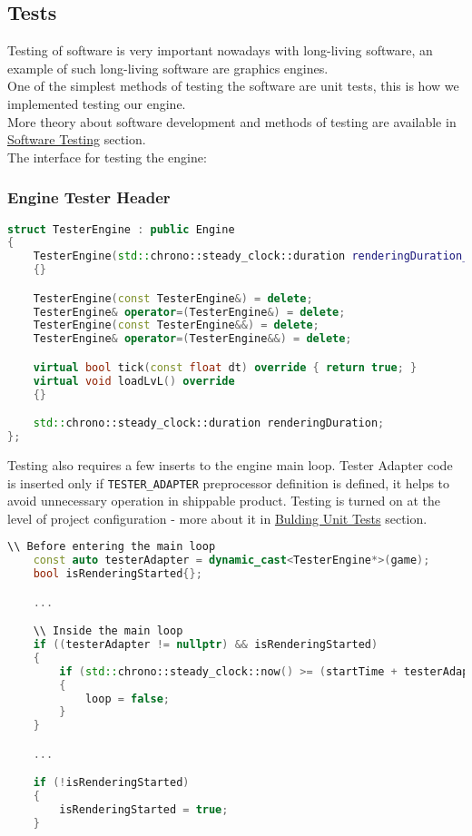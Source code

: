 \newpage

\subsection{Tests}
Testing of software is very important nowadays with long-living software, an example of such long-living software are graphics engines.\\
One of the simplest methods of testing the software are unit tests, this is how we implemented testing our engine.\\
More theory about software development and methods of testing are available in \hyperref[sec:testing]{Software Testing} section.\\

The interface for testing the engine:
\subsubsection{Engine Tester Header}
\label{sec:tester_adapter}
\begin{lstlisting}[language=c++, caption=Tester Engine class (./engine/tests/tester.cpp)]
struct TesterEngine : public Engine
{
    TesterEngine(std::chrono::steady_clock::duration renderingDuration_) : renderingDuration{renderingDuration_}
    {}

    TesterEngine(const TesterEngine&) = delete;
    TesterEngine& operator=(TesterEngine&) = delete;
    TesterEngine(const TesterEngine&&) = delete;
    TesterEngine& operator=(TesterEngine&&) = delete;

    virtual bool tick(const float dt) override { return true; }
    virtual void loadLvL() override
    {}

    std::chrono::steady_clock::duration renderingDuration;
};
\end{lstlisting}


Testing also requires a few inserts to the engine main loop. Tester Adapter code is inserted only if \texttt{TESTER\_ADAPTER} preprocessor definition is defined, it helps to avoid unnecessary operation in shippable product. Testing is turned on at the level of project configuration - more about it in \hyperref[sec:build_unit_tests]{Bulding Unit Tests} section. 
\begin{lstlisting}[language=c++, caption=Tester related code inside Engine Main Loop (./engine/src/core/core.cpp)]
    \\ Before entering the main loop
    const auto testerAdapter = dynamic_cast<TesterEngine*>(game);
    bool isRenderingStarted{};

    ...

    \\ Inside the main loop
    if ((testerAdapter != nullptr) && isRenderingStarted)
    {
        if (std::chrono::steady_clock::now() >= (startTime + testerAdapter->renderingDuration))
        {
            loop = false;
        }
    }

    ...

    if (!isRenderingStarted)
    {
        isRenderingStarted = true;
    }
\end{lstlisting}

